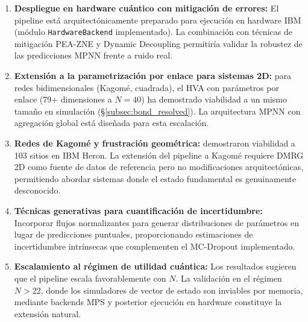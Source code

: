 \documentclass[11pt,a4paper,spanish]{book}
\begin{document}
\begin{enumerate}
    \item \textbf{Despliegue en hardware cuántico con mitigación de errores:} El pipeline está arquitectónicamente preparado para ejecución en hardware IBM (módulo \texttt{HardwareBackend} implementado). La combinación con técnicas de mitigación PEA-ZNE \citep{kim2023} y Dynamic Decoupling \citep{pokharel2025} permitiría validar la robustez de las predicciones MPNN frente a ruido real.

    \item \textbf{Extensión a la parametrización por enlace para sistemas 2D:} para redes bidimensionales (Kagomé, cuadrada), el HVA con parámetros por enlace (79+ dimensiones a $N = 40$) ha demostrado viabilidad a un mismo tamaño en simulación (§\ref{subsec:bond_resolved}). La arquitectura MPNN con agregación global está diseñada para esta escalación.

    \item \textbf{Redes de Kagomé y frustración geométrica:} \citet{ahsan2025} demostraron viabilidad a 103 sitios en IBM Heron. La extensión del pipeline a Kagomé requiere DMRG 2D como fuente de datos de referencia pero no modificaciones arquitectónicas, permitiendo abordar sistemas donde el estado fundamental es genuinamente desconocido.

    \item \textbf{Técnicas generativas para cuantificación de incertidumbre:} Incorporar flujos normalizantes \citep{zou2026} para generar distribuciones de parámetros en lugar de predicciones puntuales, proporcionando estimaciones de incertidumbre intrínsecas que complementen el MC-Dropout \citep{gal2016} implementado.

    \item \textbf{Escalamiento al régimen de utilidad cuántica:} Los resultados sugieren que el pipeline escala favorablemente con $N$. La validación en el régimen $N > 22$, donde los simuladores de vector de estado son inviables por memoria, mediante backends MPS y posterior ejecución en hardware constituye la extensión natural.


\end{enumerate}
\end{document}
